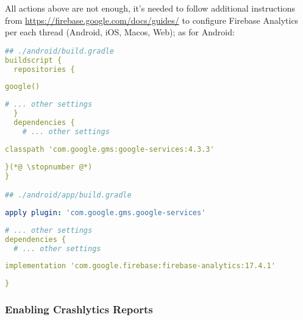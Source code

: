 \noindent All actions above are not enough, it's needed to follow additional instructions from  
\href{https://firebase.google.com/docs/guides/}{https://firebase.google.com/docs/guides/} to configure
Firebase Analytics per each thread (Android, iOS, Macos, Web); as for Android:

\begin{lstlisting}[language=yaml]
## ./android/build.gradle
buildscript {
  repositories {
\end{lstlisting}
{
\xpretocmd{\lstlisting}{\vspace{-12pt}}{}{}
\begin{lstlisting}[firstnumber=4, language=yaml, backgroundcolor=\color{backgreen}]
      google()
\end{lstlisting}
\begin{lstlisting}[firstnumber=5, language=yaml]
      # ... other settings
  }
  dependencies {
    # ... other settings
\end{lstlisting}
\begin{lstlisting}[firstnumber=9, language=yaml, backgroundcolor=\color{backgreen}]
    classpath 'com.google.gms:google-services:4.3.3'
\end{lstlisting}
\begin{lstlisting}[firstnumber=10, language=yaml]
  }(*@ \stopnumber @*)
}

## ./android/app/build.gradle
\end{lstlisting}
\begin{lstlisting}[firstnumber=2, language=yaml, backgroundcolor=\color{backgreen}]
apply plugin: 'com.google.gms.google-services'
\end{lstlisting}
\begin{lstlisting}[firstnumber=3, language=yaml]
# ... other settings
dependencies {
  # ... other settings
\end{lstlisting}
\begin{lstlisting}[firstnumber=6, language=yaml, backgroundcolor=\color{backgreen}]
  implementation 'com.google.firebase:firebase-analytics:17.4.1'
\end{lstlisting}
\begin{lstlisting}[firstnumber=7, language=yaml]
}
\end{lstlisting}
}


\subsubsection{Enabling Crashlytics Reports}

